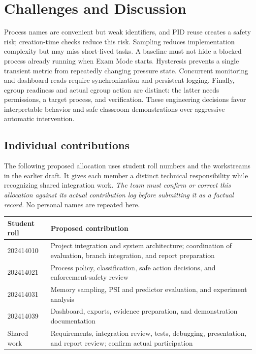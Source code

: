 \documentclass[12pt,a4paper]{article}
\begin{document}
\section{Challenges and Discussion}
Process names are convenient but weak identifiers, and PID reuse creates a safety risk; creation-time checks reduce this risk. Sampling reduces implementation complexity but may miss short-lived tasks. A baseline must not hide a blocked process already running when Exam Mode starts. Hysteresis prevents a single transient metric from repeatedly changing pressure state. Concurrent monitoring and dashboard reads require synchronization and persistent logging. Finally, cgroup readiness and actual cgroup action are distinct: the latter needs permissions, a target process, and verification. These engineering decisions favor interpretable behavior and safe classroom demonstrations over aggressive automatic intervention.

\subsection{Individual contributions}
The following proposed allocation uses student roll numbers and the workstreams in the earlier draft. It gives each member a distinct technical responsibility while recognizing shared integration work. \emph{The team must confirm or correct this allocation against its actual contribution log before submitting it as a factual record.} No personal names are repeated here.

\begin{tabularx}{\textwidth}{p{}X}
\toprule Student roll & Proposed contribution\\\midrule
202414010 & Project integration and system architecture; coordination of evaluation, branch integration, and report preparation\\
202414021 & Process policy, classification, safe action decisions, and enforcement-safety review\\
202414031 & Memory sampling, PSI and predictor evaluation, and experiment analysis\\
202414039 & Dashboard, exports, evidence preparation, and demonstration documentation\\
Shared work & Requirements, integration review, tests, debugging, presentation, and report review; confirm actual participation\\
\bottomrule\end{tabularx}
\end{document}
